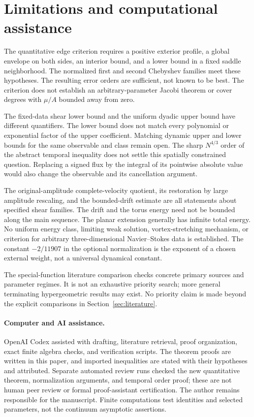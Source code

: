 \section{Limitations and computational assistance}\label{sec:discussion}

The quantitative edge criterion requires a positive exterior profile,
a global envelope on both sides, an interior bound, and a lower bound
in a fixed saddle neighborhood. The normalized first and second
Chebyshev families meet these hypotheses. The resulting error orders
are sufficient, not known to be best. The criterion does not establish
an arbitrary-parameter Jacobi theorem or cover degrees with
$\mu/A$ bounded away from zero.

The fixed-data shear lower bound and the uniform dyadic upper bound
have different quantifiers. The lower bound does not match every
polynomial or exponential factor of the upper coefficient. Matching
dynamic upper and lower bounds for the same observable and class
remain open. The sharp $N^{4/3}$ order of the abstract temporal
inequality does not settle this spatially constrained question.
Replacing a signed flux by the integral of its pointwise absolute
value would also change the observable and its cancellation argument.

The original-amplitude complete-velocity quotient, its restoration by
large amplitude rescaling, and the bounded-drift estimate are all
statements about specified shear families. The drift and the torus
energy need not be bounded along the main sequence. The planar
extension generally has infinite total energy. No uniform energy
class, limiting weak solution, vortex-stretching mechanism, or criterion
for arbitrary three-dimensional Navier--Stokes data is established.
The constant $-2/11907$ in the optional normalization is the exponent
of a chosen external weight, not a universal dynamical constant.

The special-function literature comparison checks concrete primary
sources and parameter regimes. It is not an exhaustive priority search;
more general terminating hypergeometric results may exist. No priority
claim is made beyond the explicit comparisons in
Section~\ref{sec:literature}.

\paragraph{Computer and AI assistance.}
OpenAI Codex assisted with drafting, literature retrieval, proof
organization, exact finite algebra checks, and verification scripts.
The theorem proofs are written in this paper, and imported inequalities
are stated with their hypotheses and attributed. Separate automated
review runs checked the new quantitative theorem, normalization
arguments, and temporal order proof; these are not human peer review
or formal proof-assistant certification. The author remains responsible
for the manuscript. Finite computations test identities and selected
parameters, not the continuum asymptotic assertions.

